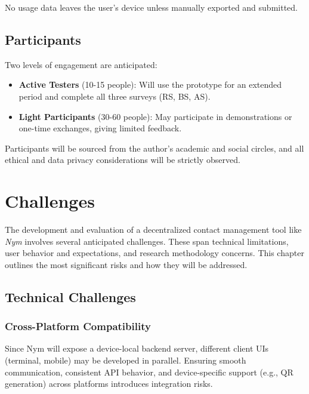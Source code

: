 \documentclass{imc-inf}
\begin{document}
No usage data leaves the user’s device unless manually exported and submitted.

\section{Participants}

Two levels of engagement are anticipated:
\begin{itemize}
  \item \textbf{Active Testers} (10-15 people): Will use the prototype for an extended period and complete all three surveys (RS, BS, AS).
  \item \textbf{Light Participants} (30-60 people): May participate in demonstrations or one-time exchanges, giving limited feedback.
\end{itemize}

Participants will be sourced from the author’s academic and social circles, and all ethical and data privacy considerations will be strictly observed.


\chapter{Challenges}

The development and evaluation of a decentralized contact management tool like \textit{Nym} involves several anticipated challenges. These span technical limitations, user behavior and expectations, and research methodology concerns. This chapter outlines the most significant risks and how they will be addressed.

\section{Technical Challenges}

\subsection*{Cross-Platform Compatibility}
Since Nym will expose a device-local backend server, different client UIs (terminal, mobile) may be developed in parallel. Ensuring smooth communication, consistent API behavior, and device-specific support (e.g., QR generation) across platforms introduces integration risks.
\end{document}

